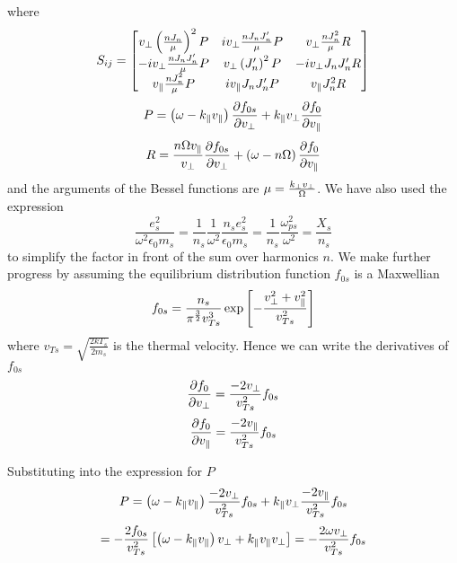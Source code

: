 where
\begin{equation}
	S_{ij} =
	\begin{bmatrix}
		v_\perp \left(\frac{nJ_n}{\mu}\right)^2 P & iv_\perp \frac{nJ_nJ_n'}{\mu} P & v_\perp \frac{nJ_n^2}{\mu} R\\
		- iv_\perp \frac{nJ_nJ_n'}{\mu} P & v_\perp \left(J_n'\right)^2 P & -i v_\perp J_n J_n' R\\
		v_\parallel \frac{nJ_n^2}{\mu} P & i v_\parallel J_n J_n' P & v_\parallel J_n^2 R\\
	\end{bmatrix}
\end{equation}
\begin{equation*}
	P = \left(\omega-k_\parallel v_\parallel\right)\frac{\partial f_{0s}}{\partial v_\perp} + k_\parallel v_\perp\frac{\partial f_0}{\partial v_\parallel}
\end{equation*}
\begin{equation*}
	R = \frac{n\Omega v_\parallel}{v_\perp} \frac{\partial f_{0s}}{\partial v_\perp} + \left(\omega - n\Omega\right) \frac{\partial f_0}{\partial v_\parallel}
\end{equation*}
and the arguments of the Bessel functions are $\mu = \frac{k_\perp v_\perp}{\Omega}$. We have also used the expression
\begin{equation*}
	\frac{e_s^2}{\omega^2 \epsilon_0 m_s} = \frac{1}{n_s} \frac{1}{\omega^2} \frac{n_s e_s^2}{\epsilon_0 m_s} = \frac{1}{n_s} \frac{\omega_{ps}^2}{\omega^2} = \frac{X_s}{n_s}
\end{equation*}
to simplify the factor in front of the sum over harmonics $n$. We make further progress by assuming the equilibrium distribution function $f_{0s}$ is a Maxwellian
\begin{equation}
	f_{0s} = \frac{n_s}{\pi^{\frac{3}{2}}v_{Ts}^3} \exp \left[ - \frac{v_\perp^2 + v_\parallel^2}{v_{Ts}^2} \right]
\end{equation}
where $v_{Ts} = \sqrt{\frac{2kT_s}{2m_s}}$ is the thermal velocity. Hence we can write the derivatives of $f_{0s}$
\begin{equation}
	\frac{\partial f_0}{\partial v_\perp} = \frac{-2v_\perp}{v_{Ts}^2} f_{0s}
\end{equation}
\begin{equation}
	\frac{\partial f_0}{\partial v_\parallel} = \frac{-2v_\parallel}{v_{Ts}^2} f_{0s}
\end{equation}

Substituting into the expression for $P$
\begin{equation*}
	P = \left( \omega - k_\parallel v_\parallel \right) \frac{-2v_\perp}{v_{Ts}^2} f_{0s} + k_\parallel v_\perp \frac{-2v_\parallel}{v_{Ts}^2} f_{0s}
\end{equation*}
\begin{equation}
	= -\frac{2f_{0s}}{v_{Ts}^2} \left[ \left( \omega - k_\parallel v_\parallel \right) v_\perp + k_\parallel v_\parallel v_\perp \right] = -\frac{2 \omega v_\perp}{v_{Ts}^2} f_{0s}
\end{equation}

